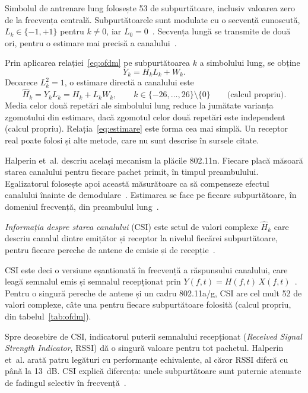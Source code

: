 Simbolul de antrenare lung folosește 53 de subpurtătoare, inclusiv valoarea zero de la frecvența centrală.
Subpurtătoarele sunt modulate cu o secvență cunoscută, $L_k \in \{-1, +1\}$ pentru $k \neq 0$, iar $L_0 = 0$~\cite[ec.~(8)]{ieee80211a}.
Secvența lungă se transmite de două ori, pentru o estimare mai precisă a canalului~\cite[Sec.~17.3.3]{ieee80211a}.

Prin aplicarea relației~\eqref{eq:ofdm} pe subpurtătoarea $k$ a simbolului lung, se obține
\begin{equation}\label{eq:ltf}
	Y_k = H_k L_k + W_k.
\end{equation}
Deoarece $L_k^2 = 1$, o estimare directă a canalului este
\begin{equation}\label{eq:estimare}
	\hat{H}_k = Y_k L_k = H_k + L_k W_k, \qquad k \in \{-26, \ldots, 26\} \setminus \{0\} \qquad \text{(calcul propriu)}.
\end{equation}
Media celor două repetări ale simbolului lung reduce la jumătate varianța zgomotului din estimare, dacă zgomotul celor două repetări este independent (calcul propriu).
Relația~\eqref{eq:estimare} este forma cea mai simplă.
Un receptor real poate folosi și alte metode, care nu sunt descrise în sursele citate.

Halperin et~al. descriu același mecanism la plăcile 802.11n.
Fiecare placă măsoară starea canalului pentru fiecare pachet primit, în timpul preambulului.
Egalizatorul folosește apoi această măsurătoare ca să compenseze efectul canalului înainte de demodulare~\cite[Sec.~2]{halperin2011}.
Estimarea se face pe fiecare subpurtătoare, în domeniul frecvență, din preambulul lung~\cite{chen2016trips}.

\begin{definition}
\emph{Informația despre starea canalului} (CSI) este setul de valori complexe $\hat{H}_k$ care descriu canalul dintre emițător și receptor la nivelul fiecărei subpurtătoare, pentru fiecare pereche de antene de emisie și de recepție~\cite{halperin2011}.
\end{definition}

CSI este deci o versiune eșantionată în frecvență a răspunsului canalului, care leagă semnalul emis și semnalul recepționat prin $Y(f,t) = H(f,t)\, X(f,t)$~\cite[Sec.~3.1]{wang2015carm}.
Pentru o singură pereche de antene și un cadru 802.11a/g, CSI are cel mult 52 de valori complexe, câte una pentru fiecare subpurtătoare folosită (calcul propriu, din tabelul~\ref{tab:ofdm}).

Spre deosebire de CSI, indicatorul puterii semnalului recepționat (\emph{Received Signal Strength Indicator}, RSSI) dă o singură valoare pentru tot pachetul.
Halperin et~al. arată patru legături cu performanțe echivalente, al căror RSSI diferă cu până la 13~dB.
CSI explică diferența: unele subpurtătoare sunt puternic atenuate de fadingul selectiv în frecvență~\cite[Sec.~2]{halperin2011}.

